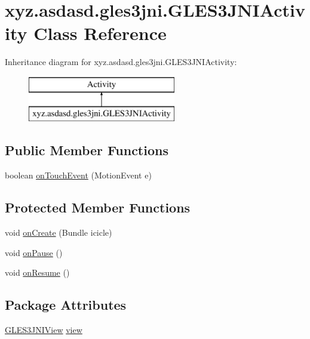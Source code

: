 \hypertarget{classxyz_1_1asdasd_1_1gles3jni_1_1_g_l_e_s3_j_n_i_activity}{}\section{xyz.\+asdasd.\+gles3jni.\+G\+L\+E\+S3\+J\+N\+I\+Activity Class Reference}
\label{classxyz_1_1asdasd_1_1gles3jni_1_1_g_l_e_s3_j_n_i_activity}
Inheritance diagram for xyz.\+asdasd.\+gles3jni.\+G\+L\+E\+S3\+J\+N\+I\+Activity\+:\begin{figure}[H]
\begin{center}
\leavevmode
\includegraphics[height=2.000000cm]{d3/d2a/classxyz_1_1asdasd_1_1gles3jni_1_1_g_l_e_s3_j_n_i_activity}
\end{center}
\end{figure}
\subsection*{Public Member Functions}
\begin{DoxyCompactItemize}
\item 
boolean \hyperlink{classxyz_1_1asdasd_1_1gles3jni_1_1_g_l_e_s3_j_n_i_activity_ade8aa81e5fa05a5d49b6dc26e7339e94}{on\+Touch\+Event} (Motion\+Event e)
\end{DoxyCompactItemize}
\subsection*{Protected Member Functions}
\begin{DoxyCompactItemize}
\item 
void \hyperlink{classxyz_1_1asdasd_1_1gles3jni_1_1_g_l_e_s3_j_n_i_activity_addc65f2124d4cd7b1f80f7a79b57ae4c}{on\+Create} (Bundle icicle)
\item 
void \hyperlink{classxyz_1_1asdasd_1_1gles3jni_1_1_g_l_e_s3_j_n_i_activity_a621fd95aed44053ab00c094ad755c666}{on\+Pause} ()
\item 
void \hyperlink{classxyz_1_1asdasd_1_1gles3jni_1_1_g_l_e_s3_j_n_i_activity_a21726157a7c15b48c69f960f32f86760}{on\+Resume} ()
\end{DoxyCompactItemize}
\subsection*{Package Attributes}
\begin{DoxyCompactItemize}
\item 
\hyperlink{classxyz_1_1asdasd_1_1gles3jni_1_1_g_l_e_s3_j_n_i_view}{G\+L\+E\+S3\+J\+N\+I\+View} \hyperlink{classxyz_1_1asdasd_1_1gles3jni_1_1_g_l_e_s3_j_n_i_activity_a2befb89b14e64b1080787351727f4121}{view}
\end{DoxyCompactItemize}
